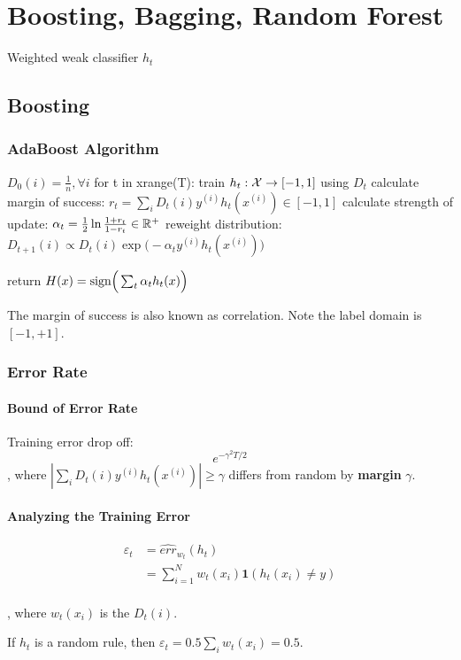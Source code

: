 \documentclass[a4paper]{report}
\begin{document}
\chapter{Boosting, Bagging, Random Forest}
Weighted weak classifier $h_t$

\section{Boosting}
\subsection{AdaBoost Algorithm}
\begin{python}[mathescape]
$D_0(i)=\frac{1}{n}, \forall i$
for t in xrange(T):
  train $h_t: \mathcal{X}\rightarrow [-1, 1]$ using $D_t$
  calculate margin of success: $r_t=\sum_i D_t(i)y^{(i)}h_t(x^{(i)})\in [-1, 1]$
  calculate strength of update: $\alpha_t = \frac{1}{2}\ln {\frac{1+r_t}{1-r_t}}\in \mathbb{R}^+$
  reweight distribution: $D_{t+1}(i)\propto D_t(i)\exp\big(-\alpha_t y^{(i)}h_t(x^{(i)})\big)$
  
return $H(x)=\text{sign}\Big(\sum_t \alpha_t h_t(x)\Big)$
\end{python}

The margin of success is also known as correlation. Note the label domain is $[-1, +1]$. 
\subsection{Error Rate}
\subsubsection{Bound of Error Rate}
Training error drop off:
$$
e^{-\gamma^2T/2}
$$
, where $|\sum_i D_t(i)y^{(i)}h_t(x^{(i)})|\geq \gamma$ differs from random by \textbf{margin} $\gamma$.

\subsubsection{Analyzing the Training Error}
\begin{align*}
\varepsilon_t &= \hat{err}_{w_t}(h_t) \\
&= \sum_{i=1}^{N} w_t (x_i) \boldsymbol{1}(h_t(x_i)\neq y) \\
\end{align*}

, where $w_t(x_i)$ is the $D_t(i)$.

If $h_t$ is a random rule, then $\varepsilon_t = 0.5\sum_i w_t(x_i)=0.5$. 
\end{document}
